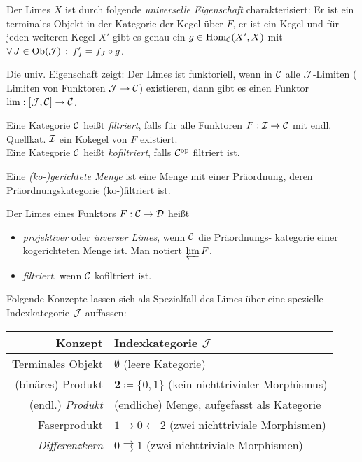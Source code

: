 \documentclass{cheat-sheet}
\begin{document}
\begin{bem}
  Der Limes $X$ ist durch folgende \emph{universelle Eigenschaft} charakterisiert:
  Er ist ein terminales Objekt in der Kategorie der Kegel über $F$, \dh{} er ist ein Kegel und für jeden weiteren Kegel $X'$ gibt es genau ein $g \in \operatorname{Hom}_{\mathcal{C}}(X', X)$ mit
  $\forall \, {J \in \operatorname{Ob}(\mathcal{J})} \,:\, f'_J = f_J \circ g$.
\end{bem}

\begin{bem}
  Die univ. Eigenschaft zeigt: Der Limes ist funktoriell, \dh{} wenn in $\mathcal{C}$ alle $\mathcal{J}$-Limiten (\dh{} Limiten von Funktoren $\mathcal{J} \to \mathcal{C}$) existieren, dann gibt es einen Funktor $\lim : [\mathcal{J}, \mathcal{C}] \to \mathcal{C}$.
\end{bem}

\begin{defn}
  Eine Kategorie $\mathcal{C}$ heißt \emph{filtriert}, falls für alle Funktoren $F : \mathcal{I} \to \mathcal{C}$ mit endl. Quellkat. $\mathcal{I}$ ein Kokegel von $F$ existiert. \\
  Eine Kategorie $\mathcal{C}$ heißt \emph{kofiltriert}, falls $\mathcal{C}^{\mathrm{op}}$ filtriert ist.
\end{defn}

\begin{defn}
  Eine \emph{(ko-)gerichtete Menge} ist eine Menge mit einer Präordnung, deren Präordnungskategorie (ko-)filtriert ist.
\end{defn}

\begin{defn}
  Der Limes eines Funktors $F : \mathcal{C} \to \mathcal{D}$ heißt
  \begin{itemize}
    \item \emph{projektiver} oder \emph{inverser Limes}, wenn $\mathcal{C}$ die Präordnungs- kategorie einer kogerichteten Menge ist. Man notiert $\varprojlim F$.
    \item \emph{filtriert}, wenn $\mathcal{C}$ kofiltriert ist.
  \end{itemize}
\end{defn}

\begin{bem}
  Folgende Konzepte lassen sich als Spezialfall des Limes über eine spezielle Indexkategorie $\mathcal{J}$ auffassen:
  \begin{center}
    \begin{tabular}{ | r | l | }
      \hline
      Konzept & Indexkategorie $\mathcal{J}$ \\ \hline
      Terminales Objekt & $\emptyset$ (leere Kategorie) \\
      (binäres) Produkt & $\mathbf{2} \coloneqq \{ 0, 1 \}$ (kein nichttrivialer Morphismus) \\
      (endl.) \emph{Produkt} & (endliche) Menge, aufgefasst als Kategorie \\
      Faserprodukt & $1 \to 0 \leftarrow 2$ (zwei nichttriviale Morphismen) \\
      \emph{Differenzkern} &  $0 \rightrightarrows 1$ (zwei nichttriviale Morphismen) \\ \hline
    \end{tabular}
  \end{center}
\end{bem}
\end{document}
